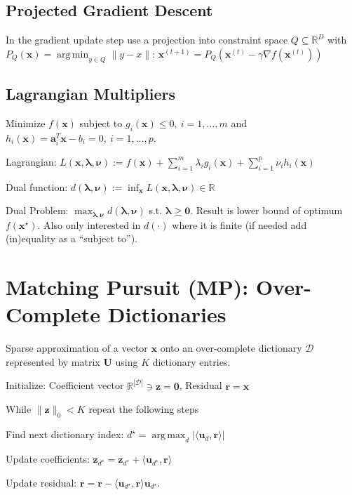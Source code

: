 \documentclass[a4paper, 11pt, landscape]{article}
\DeclareMathOperator*{\argmin}{arg\,min}
\DeclareMathOperator*{\argmax}{arg\,max}
\begin{document}
\begin{multicols*}{3}
\subsection{Projected Gradient Descent}
In the gradient update step use a projection into constraint space $Q \subseteq \mathbb{R}^D$ with $P_Q(\mathbf{x}) = \argmin_{y \in Q} \|y - x\|$: $\mathbf{x}^{(t+1)} = P_Q\left(\mathbf{x}^{(t)} - \gamma \nabla f(\mathbf{x}^{(t)})\right)$

\subsection{Lagrangian Multipliers}
Minimize  $f(\mathbf{x})$ subject to $g_i(\mathbf{x}) \leq 0,\ i = 1, \ldots, m$ and $h_i(\mathbf{x}) = \mathbf{a}_i^T \mathbf{x} - b_i = 0,\ i = 1, \ldots, p$.
\begin{compactdesc}
	\item[Lagrangian:] $L(\mathbf{x}, \boldsymbol{\lambda}, \boldsymbol{\nu}) := f(\mathbf{x}) + \sum_{i=1}^m \lambda_i g_i(\mathbf{x}) + \sum_{i=1}^p \nu_i h_i(\mathbf{x})$
	\item[Dual function:] $d(\boldsymbol{\lambda}, \boldsymbol{\nu}) := \inf_{\mathbf{x}} L(\mathbf{x}, \boldsymbol{\lambda}, \boldsymbol{\nu}) \in \mathbb{R}$
	\item[Dual Problem:] $\max_{\boldsymbol{\lambda}, \boldsymbol{\nu}} d(\boldsymbol{\lambda}, \boldsymbol{\nu})$ s.t. $\boldsymbol{\lambda} \geq \mathbf{0}$. Result is lower bound of optimum $f(\mathbf{x}^\star)$. Also only interested in $d(\cdot)$ where it is finite (if needed add (in)equality as a ``subject to'').
\end{compactdesc}

\section{Matching Pursuit (MP): Over-Complete Dictionaries}
Sparse approximation of a vector $\mathbf{x}$ onto an over-complete dictionary $\mathcal{D}$ represented by matrix $\mathbf{U}$ using $K$ dictionary entries.
\begin{compactenum}
	\item Initialize: Coefficient vector $\mathbb{R}^{|\mathcal{D}|} \ni \mathbf{z} = \mathbf{0}$, Residual $\mathbf{r} = \mathbf{x}$
	\item While $\|\mathbf{z}\|_0 < K$ repeat the following steps
	\item Find next dictionary index: $d^\star = \argmax_d |\langle \mathbf{u}_d, \mathbf{r} \rangle|$
	\item Update coefficients: $\mathbf{z}_{d^\star} = \mathbf{z}_{d^\star} + \langle \mathbf{u}_{d^\star}, \mathbf{r} \rangle$
	\item Update residual: $\mathbf{r} = \mathbf{r} - \langle \mathbf{u}_{d^\star}, \mathbf{r} \rangle \mathbf{u}_{d^\star}$.
\end{compactenum}


\end{multicols*}
\end{document}
